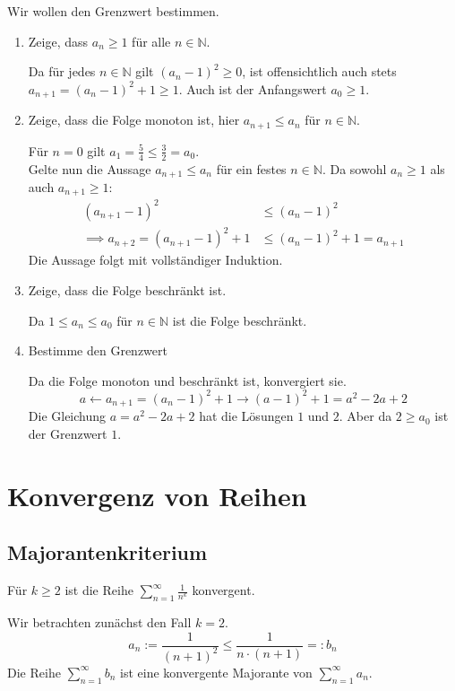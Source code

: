 \documentclass[10pt,a4paper]{article}
\begin{document}
\begin{multicols*}{2}
Wir wollen den Grenzwert bestimmen.\\

\begin{enumerate}[label=\alph*.]
	\item Zeige, dass $a_n\ge1$ für alle $n\in\mathbb{N}$.

		Da für jedes $n\in\mathbb{N}$ gilt $(a_n-1)^2\ge0$, ist offensichtlich auch stets $a_{n+1}=(a_n-1)^2+1 \ge 1$.
		Auch ist der Anfangswert $a_0\ge1$.

	\item Zeige, dass die Folge monoton ist, hier $a_{n+1}\le a_n$ für $n\in\mathbb{N}$.

		Für $n=0$ gilt $a_1=\frac{5}{4} \le \frac{3}{2}=a_0$.\\
		Gelte nun die Aussage $a_{n+1}\le a_n$ für ein festes $n\in\mathbb{N}$.
		Da sowohl $a_n\ge1$ als auch $a_{n+1}\ge1$:
		\begin{align*}
			(a_{n+1}-1)^2 &\le (a_n-1)^2 \\
			\implies a_{n+2}=(a_{n+1}-1)^2+1 &\le (a_n - 1)^2+1=a_{n+1}
		\end{align*}
		Die Aussage folgt mit vollständiger Induktion.

	\item Zeige, dass die Folge beschränkt ist.

		Da $1\le a_n \le a_0$ für $n\in\mathbb{N}$ ist die Folge beschränkt.

	\item Bestimme den Grenzwert

		Da die Folge monoton und beschränkt ist, konvergiert sie.\\
		\[a \longleftarrow a_{n+1}=(a_n-1)^2+1 \longrightarrow (a-1)^2+1=a^2-2a+2\]
		Die Gleichung $a=a^2-2a+2$ hat die Lösungen $1$ und $2$.
		Aber da $2\ge a_0$ ist der Grenzwert $1$.
\end{enumerate}

\vfill\null
\columnbreak

\section*{Konvergenz von Reihen}

\subsection*{Majorantenkriterium}
Für $k\ge2$ ist die Reihe $\displaystyle \sum_{n=1}^\infty\frac{1}{n^k}$ konvergent.

Wir betrachten zunächst den Fall $k=2$.
\[a_n := \frac{1}{(n+1)^2} \le \frac{1}{n\cdot(n+1)} =: b_n\]
Die Reihe $\sum_{n=1}^\infty b_n$ ist eine konvergente Majorante von $\sum_{n=1}^\infty a_n$.


\end{multicols*}
\end{document}
